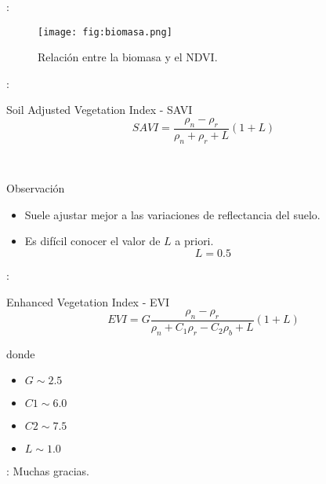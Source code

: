 \begin{frame}{\secname : \subsecname}
  \begin{figure}
    \centering
    \texttt{[image: fig:biomasa.png]}
    \caption{Relación entre la biomasa y el NDVI.}
    \label{}
  \end{figure}
\end{frame}

\begin{frame}{\secname : \subsecname}
    \begin{block}{Soil Adjusted Vegetation Index - SAVI}
        \begin{equation}
            SAVI = \frac{\rho_n-\rho_r}{\rho_n+\rho_r+L}(1+L)
        \end{equation}
    \end{block}\pause\
    \begin{block}{Observación}
        \begin{itemize}[<+->]
            \item Suele ajustar mejor a las variaciones de reflectancia del
                suelo.
            \item Es difícil conocer el valor de $L$ a priori. \begin{equation}
        L=0.5
    \end{equation}
        \end{itemize}
    \end{block}
\end{frame}

\begin{frame}{\secname : \subsecname}
    \begin{block}{Enhanced Vegetation Index - EVI}
        \begin{equation}
            EVI = G\frac{\rho_n - \rho_r}{\rho_n+C_1\rho_r-C_2\rho_b+L}(1+L)
        \end{equation}
    \end{block}
    donde
    \begin{itemize}
        \item $G  \sim 2.5$
        \item $C1 \sim 6.0$
        \item $C2 \sim 7.5$
        \item $L  \sim 1.0$
    \end{itemize}
\end{frame}

\begin{frame}{\secname : \subsecname}
Muchas gracias.
\end{frame}
